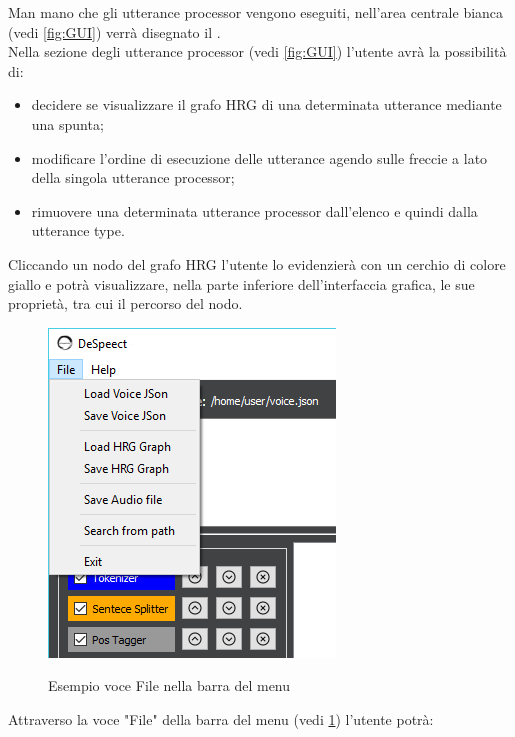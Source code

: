 \documentclass[../AnalisideiRequisiti.tex]{subfiles}
\begin{document}
		 Man mano che gli utterance processor vengono eseguiti, nell'area centrale bianca (vedi \ref{fig:GUI}) verrà disegnato il .
		 \\Nella sezione degli utterance processor (vedi \ref{fig:GUI}) l'utente avrà la possibilità di:
		\begin{itemize}
			\item{}decidere se visualizzare il grafo HRG di una determinata utterance mediante una spunta;
			\item{}modificare l'ordine di esecuzione delle utterance agendo sulle freccie a lato della singola utterance processor;
			\item{}rimuovere una determinata utterance processor dall'elenco e quindi dalla utterance type.
		\end{itemize}
	
		 Cliccando un nodo del grafo HRG l'utente lo evidenzierà con un cerchio di colore giallo e potrà visualizzare, nella parte inferiore dell'interfaccia grafica, le sue proprietà, tra cui il percorso del nodo.
	\begin{figure}[htp]
	\caption{Esempio voce File nella barra del menu}
	\centering
	\includegraphics[]{../img/menu-file.png}
	\label{fig:menufile}
\end{figure}
	 Attraverso la voce "File" della barra del menu (vedi \ref{fig:menufile}) l'utente potrà:
	 	
\end{document}
